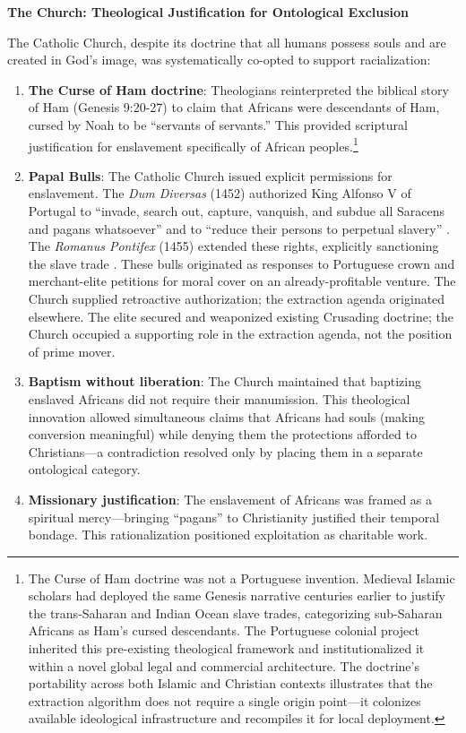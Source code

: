 \textbf{The Church: Theological Justification for Ontological Exclusion}

The Catholic Church, despite its doctrine that all humans possess souls and are created in God's image, was systematically co-opted to support racialization:

\begin{enumerate}
    \item \textbf{The Curse of Ham doctrine}: Theologians reinterpreted the biblical story of Ham (Genesis 9:20-27) to claim that Africans were descendants of Ham, cursed by Noah to be ``servants of servants.'' This provided scriptural justification for enslavement specifically of African peoples.\footnote{The Curse of Ham doctrine was not a Portuguese invention. Medieval Islamic scholars had deployed the same Genesis narrative centuries earlier to justify the trans-Saharan and Indian Ocean slave trades, categorizing sub-Saharan Africans as Ham's cursed descendants. The Portuguese colonial project inherited this pre-existing theological framework and institutionalized it within a novel global legal and commercial architecture. The doctrine's portability across both Islamic and Christian contexts illustrates that the extraction algorithm does not require a single origin point---it colonizes available ideological infrastructure and recompiles it for local deployment.}
    
    \item \textbf{Papal Bulls}: The Catholic Church issued explicit permissions for enslavement. The \textit{Dum Diversas} (1452) authorized King Alfonso V of Portugal to ``invade, search out, capture, vanquish, and subdue all Saracens and pagans whatsoever'' and to ``reduce their persons to perpetual slavery'' \cite{dumdiversas}. The \textit{Romanus Pontifex} (1455) extended these rights, explicitly sanctioning the slave trade \cite{romanuspontifex}. These bulls originated as responses to Portuguese crown and merchant-elite petitions for moral cover on an already-profitable venture. The Church supplied retroactive authorization; the extraction agenda originated elsewhere. The elite secured and weaponized existing Crusading doctrine; the Church occupied a supporting role in the extraction agenda, not the position of prime mover.
    
    \item \textbf{Baptism without liberation}: The Church maintained that baptizing enslaved Africans did not require their manumission. This theological innovation allowed simultaneous claims that Africans had souls (making conversion meaningful) while denying them the protections afforded to Christians---a contradiction resolved only by placing them in a separate onto\-logical category.
    
    \item \textbf{Missionary justification}: The enslavement of Africans was framed as a spiritual mercy---bringing ``pagans'' to Christianity justified their temporal bondage. This rationalization positioned exploitation as charitable work.
\end{enumerate}

